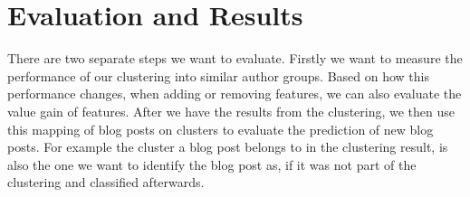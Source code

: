 \section{Evaluation and Results}
\label{sec:results}


There are two separate steps we want to evaluate.
Firstly we want to measure the performance of our clustering into similar author groups.
Based on how this performance changes, when adding or removing features, we can also evaluate the value gain of features.
After we have the results from the clustering, we then use this mapping of blog posts on clusters to evaluate the prediction of new blog posts.
For example the cluster a blog post belongs to in the clustering result, is also the one we want to identify the blog post as, if it was not part of the clustering and classified afterwards.


